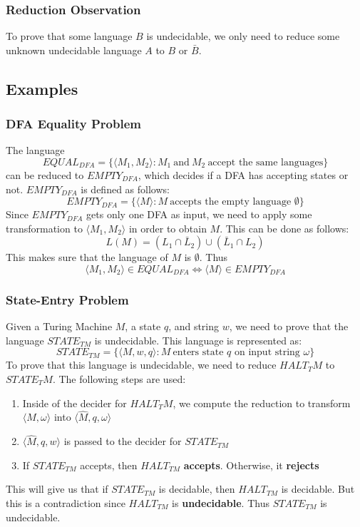 \documentclass{article}
\begin{document}
\subsubsection{Reduction Observation}
To prove that some language $B$ is undecidable, we only need to reduce some unknown undecidable language $A$ to $B$ or $\bar B$.

\subsection{Examples}
\subsubsection{DFA Equality Problem}
The language
\[ EQUAL_{DFA} = \{ \langle M_1, M_2 \rangle : M_1~\text{and}~M_2~\text{accept the same languages}\} \]
can be reduced to $EMPTY_{DFA}$, which decides if a DFA has accepting states or not. $EMPTY_{DFA}$ is defined as follows:
\[ EMPTY_{DFA} = \{ \langle M \rangle : M~\text{accepts the empty language $\emptyset$} \} \]
Since $EMPTY_{DFA}$ gets only one DFA as input, we need to apply some transformation to $\langle M_1, M_2 \rangle$ in order to obtain $M$. This can be done as follows:
\[ L(M) = (L_1 \cap \bar L_2) \cup (\bar L_1 \cap L_2) \]
This makes sure that the language of $M$ is $\emptyset$. Thus
\[ \langle M_1, M_2 \rangle \in EQUAL_{DFA} \iff \langle M \rangle \in EMPTY_{DFA} \]

\subsubsection{State-Entry Problem}
Given a Turing Machine $M$, a state $q$, and string $w$, we need to prove that the language $STATE_{TM}$ is undecidable. This language is represented as:
\[ STATE_{TM} = \{ \langle M, w, q \rangle : M~\text{enters state $q$ on input string $\omega$} \} \]
To prove that this language is undecidable, we need to reduce $HALT_TM$ to $STATE_TM$. The following steps are used:

\begin{enumerate}
	\item Inside of the decider for $HALT_TM$, we compute the reduction to transform $\langle M, \omega \rangle$ into $\langle \hat M, q, \omega \rangle$
	\item $\langle \hat M, q, w \rangle$ is passed to the decider for $STATE_{TM}$
    \item If $STATE_{TM}$ accepts, then $HALT_{TM}$ \textbf{accepts}. Otherwise, it \textbf{rejects}
\end{enumerate}
This will give us that if $STATE_{TM}$ is decidable, then $HALT_{TM}$ is decidable. But this is a contradiction since $HALT_{TM}$ is \textbf{undecidable}. Thus $STATE_{TM}$ is undecidable.
\end{document}
